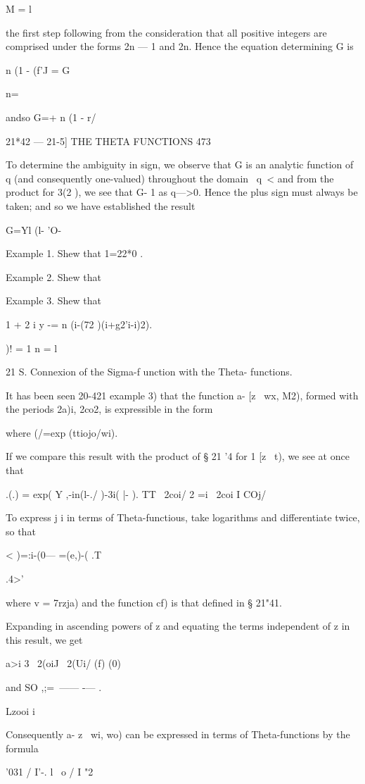 M = l

the first step following from the consideration that all positive
integers are comprised under the forms 2n — 1 and 2n. Hence the
equation determining G is

n (1 - (f'J = G\

n=\

andso G=+ n (1 - r/

21*42 — 21-5] THE THETA FUNCTIONS 473

To determine the ambiguity in sign, we observe that G is an analytic
function of q (and consequently one-valued) throughout the domain \ q\
< \; and from the product for 3(2 ), we see that G- 1 as q—>0. Hence
the plus sign must always be taken; and so we have established the
result

G=Yl (l- 'O-

Example 1. Shew that 1=22*0 .

Example 2. Shew that

Example 3. Shew that

1 + 2 i y -= n (i-(72 )(i+g2'i-i)2).

)! = 1 n = l

21 S. Connexion of the Sigma-f unction with the Theta- functions.

It has been seen 20-421 example 3) that the function a- [z \ wx, M2),
formed with the periods 2a)i, 2co2, is expressible in the form

where (/=exp (ttiojo/wi).

If we compare this result with the product of § 21 '4 for 1 [z \ t),
we see at once that

.(.) = exp( Y ,-in(l-./ )-3i( |- ). TT \ 2coi/ 2 =i \ 2coi I COj/

To express j i in terms of Theta-functious, take logarithms and
differentiate twice, so that

 < )=:i-(0— =(e,)-( .T

.4>'

where v = 7rzja) and the function cf) is that defined in § 21"41.

Expanding in ascending powers of z and equating the terms independent
of z in this result, we get

a>i 3 \ 2(oiJ \ 2(Ui/ (f) (0)

and SO ,;=\ —— -— .

Lzooi i

Consequently a- z \ wi, wo) can be expressed in terms of
Theta-functions by the formula

'031 / I'-. l \ o / I "2

